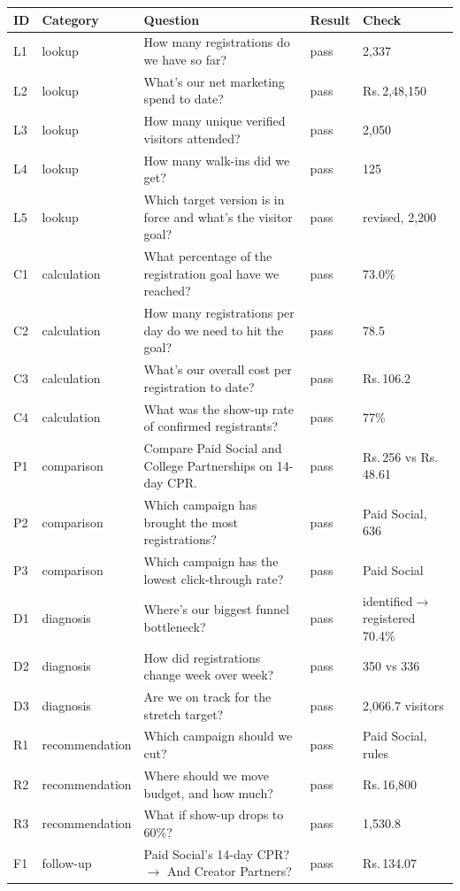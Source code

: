 \documentclass[11pt,a4paper]{article}
\newcommand{\rs}{Rs.\,}
\begin{document}
{\small
\begin{longtable}{@{}p{0.6cm}p{2.3cm}p{7.2cm}p{0.9cm}p{3.4cm}@{}}
\toprule
\textbf{ID} & \textbf{Category} & \textbf{Question} & \textbf{Result} & \textbf{Check} \\
\midrule
\endhead
L1 & lookup & How many registrations do we have so far? & pass & 2,337 \\
L2 & lookup & What's our net marketing spend to date? & pass & \rs2,48,150 \\
L3 & lookup & How many unique verified visitors attended? & pass & 2,050 \\
L4 & lookup & How many walk-ins did we get? & pass & 125 \\
L5 & lookup & Which target version is in force and what's the visitor goal? & pass & revised, 2,200 \\
C1 & calculation & What percentage of the registration goal have we reached? & pass & 73.0\% \\
C2 & calculation & How many registrations per day do we need to hit the goal? & pass & 78.5 \\
C3 & calculation & What's our overall cost per registration to date? & pass & \rs106.2 \\
C4 & calculation & What was the show-up rate of confirmed registrants? & pass & 77\% \\
P1 & comparison & Compare Paid Social and College Partnerships on 14-day CPR. & pass & \rs256 vs \rs48.61 \\
P2 & comparison & Which campaign has brought the most registrations? & pass & Paid Social, 636 \\
P3 & comparison & Which campaign has the lowest click-through rate? & pass & Paid Social \\
D1 & diagnosis & Where's our biggest funnel bottleneck? & pass & identified$\to$registered 70.4\% \\
D2 & diagnosis & How did registrations change week over week? & pass & 350 vs 336 \\
D3 & diagnosis & Are we on track for the stretch target? & pass & 2,066.7 visitors \\
R1 & recommendation & Which campaign should we cut? & pass & Paid Social, rules \\
R2 & recommendation & Where should we move budget, and how much? & pass & \rs16,800 \\
R3 & recommendation & What if show-up drops to 60\%? & pass & 1,530.8 \\
F1 & follow-up & Paid Social's 14-day CPR? $\to$ And Creator Partners? & pass & \rs134.07 \\

\end{longtable}}
\end{document}
